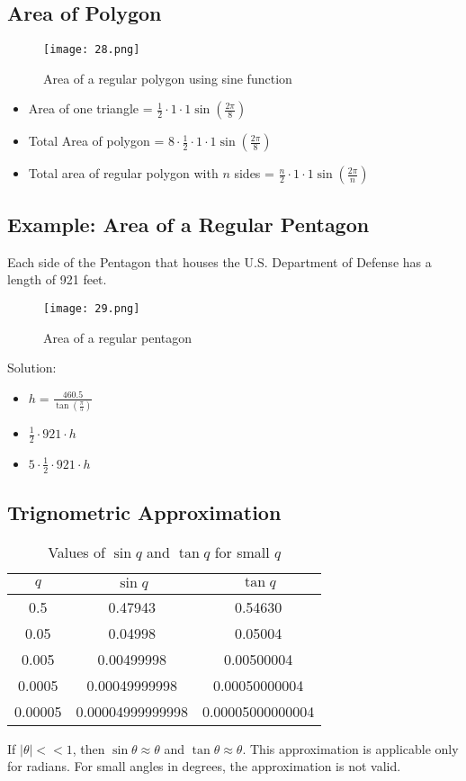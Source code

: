 \subsection{Area of Polygon}
\begin{figure}
    \centering
    \texttt{[image: 28.png]}
    \caption{Area of a regular polygon using sine function}
\end{figure}
\begin{itemize}
    \item Area of one triangle = $\frac{1}{2} \cdot 1 \cdot 1 \sin(\frac{2\pi}{8})$
    \item Total Area of polygon = $8 \cdot \frac{1}{2} \cdot 1 \cdot 1 \sin(\frac{2\pi}{8})$
    \item Total area of regular polygon with $n$ sides = $\frac{n}{2} \cdot 1 \cdot 1 \sin(\frac{2\pi}{n})$
\end{itemize}

\subsection{Example: Area of a Regular Pentagon}
Each side of the Pentagon that houses the U.S. Department of Defense has a length of 921 feet.
\begin{figure}
    \centering
    \texttt{[image: 29.png]}
    \caption{Area of a regular pentagon}
\end{figure}
Solution:
\begin{itemize}
    \item $h = \frac{460.5}{\tan (\frac{\pi}{5})}$
    \item $\frac{1}{2} \cdot 921 \cdot h$
    \item $5 \cdot \frac{1}{2} \cdot 921 \cdot h$
\end{itemize}

\subsection{Trignometric Approximation}
\begin{table}[h]
    \centering
    \begin{tabular}{|c|c|c|}
        \hline
        $q$ & $\sin q$ & $\tan q$ \\
        \hline
        0.5 & 0.47943 & 0.54630 \\
        0.05 & 0.04998 & 0.05004 \\
        0.005 & 0.00499998 & 0.00500004 \\
        0.0005 & 0.00049999998 & 0.00050000004 \\
        0.00005 & 0.00004999999998 & 0.00005000000004 \\
        \hline
    \end{tabular}
    \caption{Values of $\sin q$ and $\tan q$ for small $q$}
\end{table}
If $| \theta | << 1$, then $\sin \theta \approx \theta$ and $\tan \theta \approx \theta$.
This approximation is applicable only for radians. For small angles in degrees, the approximation is not valid.

